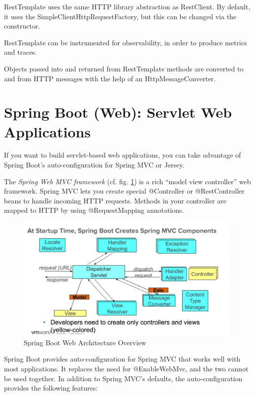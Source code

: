 \documentclass{scrartcl}
\begin{document}
RestTemplate uses the same HTTP library abstraction as RestClient. By default, it uses the SimpleClientHttpRequestFactory, but this can be changed via the constructor.

RestTemplate can be instrumented for observability, in order to produce metrics and traces.

Objects passed into and returned from RestTemplate methods are converted to and from HTTP messages with the help of an HttpMessageConverter.

\section{Spring Boot (Web): Servlet Web Applications}

If you want to build servlet-based web applications, you can take advantage of Spring Boot’s auto-configuration for Spring MVC or Jersey.

The \textit{Spring Web MVC framework} (cf. fig. \ref{fig:spring-web}) is a rich “model view controller” web framework.
Spring MVC lets you create special @Controller or @RestController beans to handle incoming HTTP requests. Methods in your controller are mapped to HTTP by using @RequestMapping annotations.

\begin{figure}[h]
    \centering
    \includegraphics[width=1\linewidth]{spring-web}
    \caption{Spring Boot Web Architecture Overview}
    \label{fig:spring-web}
\end{figure}

Spring Boot provides auto-configuration for Spring MVC that works well with most applications. It replaces the need for @EnableWebMvc, and the two cannot be used together. In addition to Spring MVC’s defaults, the auto-configuration provides the following features:
\end{document}
